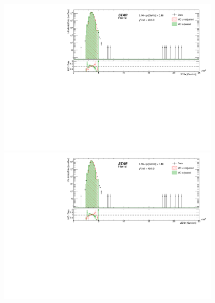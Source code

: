 \begin{figure}[ht]
{  \includegraphics[width=\linewidth,page=9]{graphics/dedx/dEdx_DataVsMC.pdf}\\[3pt]
  \includegraphics[width=\linewidth,page=11]{graphics/dedx/dEdx_DataVsMC.pdf}%
}%
\end{figure}

